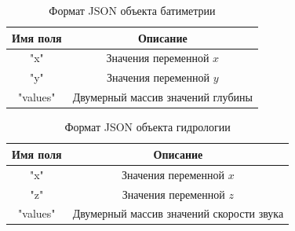 \documentclass{fefu}
\begin{document}
                \begin{table}[p]
                    \centering
                    \begin{tabular}{|c|c|}
                        \hline
                        Имя поля & Описание\\
                        \hline
                        \textsf{"x"} & Значения переменной $x$\\
                        \hline
                        \textsf{"y"} & Значения переменной $y$\\
                        \hline
                        \textsf{"values"} & Двумерный массив значений глубины\\
                        \hline
                    \end{tabular}
                    \caption{\label{tbl::JSON_bat}Формат JSON объекта батиметрии}
                \end{table}
                \begin{table}[p]
                    \centering
                    \begin{tabular}{|c|c|}
                        \hline
                        Имя поля & Описание\\
                        \hline
                        \textsf{"x"} & Значения переменной $x$\\
                        \hline
                        \textsf{"z"} & Значения переменной $z$\\
                        \hline
                        \textsf{"values"} & Двумерный массив значений скорости звука\\
                        \hline
                    \end{tabular}
                    \caption{\label{tbl::JSON_hyd}Формат JSON объекта гидрологии}
                \end{table}
\end{document}
